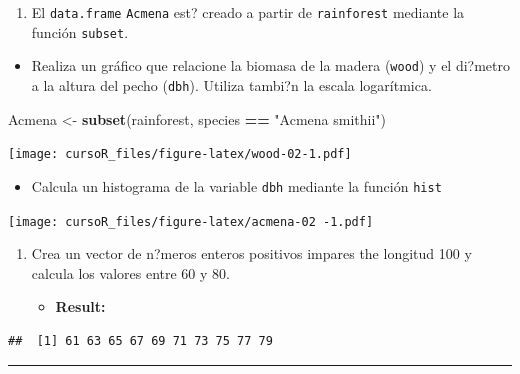 \documentclass[]{book}
\newenvironment{Shaded}{\begin{snugshade}}{\end{snugshade}}
\newcommand{\KeywordTok}[1]{\textcolor[rgb]{0.13,0.29,0.53}{\textbf{#1}}}
\newcommand{\StringTok}[1]{\textcolor[rgb]{0.31,0.60,0.02}{#1}}
\newcommand{\OperatorTok}[1]{\textcolor[rgb]{0.81,0.36,0.00}{\textbf{#1}}}
\newcommand{\NormalTok}[1]{#1}
\providecommand{\tightlist}{%
  \setlength{\itemsep}{0pt}\setlength{\parskip}{0pt}}
\begin{document}
\begin{enumerate}
\def\labelenumi{\arabic{enumi}.}
\setcounter{enumi}{2}
\tightlist
\item
  El \texttt{data.frame} \texttt{Acmena} est? creado a partir de
  \texttt{rainforest} mediante la función \texttt{subset}.
\end{enumerate}

\begin{itemize}
\tightlist
\item
  Realiza un gráfico que relacione la biomasa de la madera
  (\texttt{wood}) y el di?metro a la altura del pecho (\texttt{dbh}).
  Utiliza tambi?n la escala logarítmica.
\end{itemize}

\begin{Shaded}
\begin{Highlighting}[]
\NormalTok{Acmena <-}\StringTok{ }\KeywordTok{subset}\NormalTok{(rainforest, species }\OperatorTok{==}\StringTok{ "Acmena smithii"}\NormalTok{)}
\end{Highlighting}
\end{Shaded}

\texttt{[image: cursoR\_files/figure-latex/wood-02-1.pdf]}

\begin{itemize}
\tightlist
\item
  Calcula un histograma de la variable \texttt{dbh} mediante la función
  \texttt{hist}
\end{itemize}

\texttt{[image: cursoR\_files/figure-latex/acmena-02 -1.pdf]}

\begin{enumerate}
\def\labelenumi{\arabic{enumi}.}
\setcounter{enumi}{3}
\item
  Crea un vector de n?meros enteros positivos impares the longitud 100 y
  calcula los valores entre 60 y 80.

  \begin{itemize}
  \tightlist
  \item
    \textbf{Result:}
  \end{itemize}
\end{enumerate}

\begin{verbatim}
##  [1] 61 63 65 67 69 71 73 75 77 79
\end{verbatim}

\begin{center}\rule{0.5\linewidth}{\linethickness}\end{center}
\end{document}
